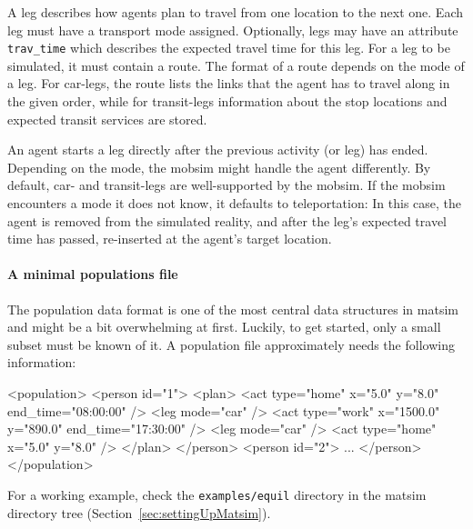 A \gls{leg} describes how agents plan to travel from one location to the next one. Each \gls{leg} must have a transport mode assigned. Optionally, legs may have an attribute \lstinline|trav_time| which describes the expected travel time for this leg. For a leg to be simulated, it must contain a route. The format of a route depends on the mode of a leg. For car-legs, the route lists the links that the agent has to travel along in the given order, while for transit-legs information about the stop locations and expected transit services are stored.

An agent starts a leg directly after the previous activity (or leg) has ended. Depending on the mode, the \gls{mobsim} might handle the agent differently. By default, car- and transit-legs are well-supported by the \gls{mobsim}. If the \gls{mobsim} encounters a mode it does not know, it defaults to \gls{teleportation}: In this case, the agent is removed from the simulated reality, and after the leg's expected travel time has passed, re-inserted at the agent's target location.

\paragraph{A minimal populations file}

The population data format is one of the most central data structures in \gls{matsim} and might be a bit overwhelming at first. Luckily, to get started, only a small subset must be known of it.  A population file approximately needs the following information:
\begin{xml}
<population> 
   <person id="1"> 
      <plan> 
         <act type="home" x="5.0" y="8.0" end_time="08:00:00" /> 
         <leg mode="car" /> 
         <act type="work" x="1500.0" y="890.0" end_time="17:30:00" /> 
         <leg mode="car" /> 
         <act type="home" x="5.0" y="8.0" /> 
      </plan> 
   </person> 
   <person id="2"> 
      ... 
   </person> 
</population>
\end{xml}
For a working example, check the \lstinline{examples/equil} directory in the \gls{matsim} directory tree (\cf Section~\ref{sec:settingUpMatsim}).

